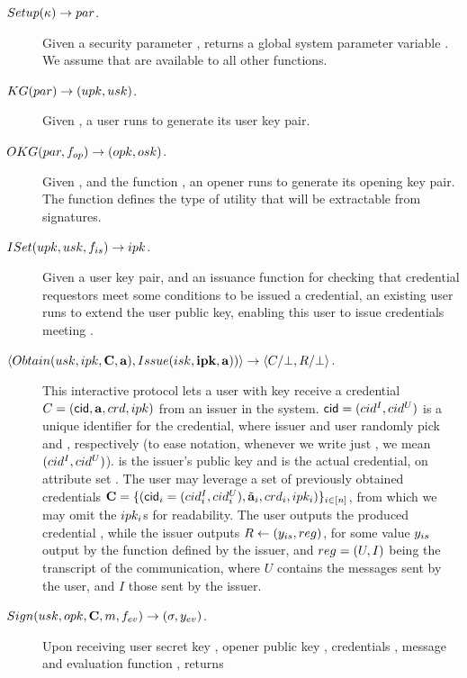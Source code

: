 \begin{description}
\item[$Setup(\kappa) \rightarrow par$.] Given a security parameter \secpar,
  returns a global system parameter variable \parm. We assume that \parm are
  available to all other functions.
\item[$KG(par) \rightarrow (upk,usk)$.] Given \parm, a user runs
  \KeyGen to generate its user key pair. 
\item[$OKG(par,f_{op}) \rightarrow (opk,osk)$.] Given \parm, and the
  function \finsp, an opener runs \OKeyGen to generate its opening key pair.
  The function \finsp defines the type of utility that will be extractable from
  signatures.
\item[$ISet(upk,usk,f_{is}) \rightarrow ipk$.] Given a user key
  pair, and an issuance function \fissue for checking that credential requestors
  meet some conditions to be issued a credential, an existing user runs \ISet to
  extend the user public key, enabling this user to issue credentials meeting
  \fissue.
\item[$\langle
  Obtain(usk,ipk,\mathbf{C},\mathbf{a}),
  Issue(isk,\mathbf{ipk},\mathbf{a}))  
  \rangle \rightarrow \langle C/\bot,R/\bot
  \rangle$.] %
  This interactive protocol lets a user with key \usk receive a credential
  $C=(\mathsf{cid},\mathbf{a},crd,ipk)$
  from an issuer in the system. $\mathsf{cid}=(cid^I,cid^U)$ is a unique identifier for
  the credential, where issuer and user randomly pick \cidi and \cidu,
  respectively (to ease notation, whenever we write just \cid, we mean $(cid^I,
  cid^U)$). \ipk is the issuer's public key and \cred is the actual credential,
  on attribute set \attrs. The user may leverage a set of previously obtained
  credentials $\mathbf{C}=\lbrace (\mathsf{cid}_i=(cid^I_i,cid^U_i),\tilde{\mathbf{a}}_i,crd_i,
  ipk_i)\rbrace_{i\in[n]}$, from which we may omit the $ipk_i$s for
  readability. The user outputs the produced credential \Cred, while the issuer
  outputs $R \gets (y_{is},reg)$, for some value $y_{is}$ output by
  the \fissue function defined by the issuer, and $reg=(U,I)$ being the
  transcript of the communication, where $U$ contains the messages sent by
  the user, and $I$ those sent by the issuer.
\item[$Sign(usk,opk,\mathbf{C},m,f_{ev}) \rightarrow (\sigma,y_{ev})$.] %
  Upon receiving user secret key \usk, opener public key \opk, 
  credentials \sCred, message \msg and evaluation function \feval, returns

\end{description}
